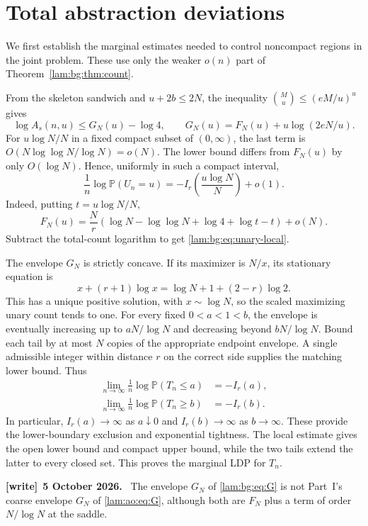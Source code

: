 \documentclass[11pt,a4paper]{article}
\numberwithin{equation}{section}
\theoremstyle{remark}
\newcommand{\Prob}{\mathbb P}
\newenvironment{writenote}[1][]{\par\smallskip\begingroup\small
 \noindent\textbf{[write]}\if\relax\detokenize{#1}\relax\else~\textbf{#1.}\fi\ }%
 {\par\endgroup\smallskip}
\begin{document}
\section{Total abstraction deviations}\label{lam:bg:sec:unary}
We first establish the marginal estimates needed to control noncompact regions in the joint problem. These use only the weaker $o(n)$ part of Theorem~\ref{lam:bg:thm:count}.

From the skeleton sandwich and $u+2b\le2N$, the inequality $\binom Mu\le(eM/u)^u$ gives
\begin{equation}\label{lam:bg:eq:G}
 \log A_s(n,u)\le G_N(u)-\log4,
 \qquad G_N(u)=F_N(u)+u\log(2eN/u).
\end{equation}
For $u\log N/N$ in a fixed compact subset of $(0,\infty)$, the last term is $O(N\log\log N/\log N)=o(N)$. The lower bound differs from $F_N(u)$ by only $O(\log N)$. Hence, uniformly in such a compact interval,
\begin{equation}\label{lam:bg:eq:unary-local}
 \frac1n\log\Prob(U_n=u)=-I_r\!\left(\frac{u\log N}{N}\right)+o(1).
\end{equation}
Indeed, putting $t=u\log N/N$,
\[
 F_N(u)=\frac Nr\left(\log N-\log\log N+\log4+\log t-t\right)+o(N).
\]
Subtract the total-count logarithm to get \eqref{lam:bg:eq:unary-local}.

The envelope $G_N$ is strictly concave. If its maximizer is $N/x$, its stationary equation is
\begin{equation}\label{lam:bg:eq:G-saddle}
 x+(r+1)\log x=\log N+1+(2-r)\log2.
\end{equation}
This has a unique positive solution, with $x\sim\log N$, so the scaled maximizing unary count tends to one. For every fixed $0<a<1<b$, the envelope is eventually increasing up to $aN/\log N$ and decreasing beyond $bN/\log N$. Bound each tail by at most $N$ copies of the appropriate endpoint envelope. A single admissible integer within distance $r$ on the correct side supplies the matching lower bound. Thus
\begin{align}
 \lim_{n\to\infty}\frac1n\log\Prob(T_n\le a)&=-I_r(a),\label{lam:bg:eq:unary-lower}\\
 \lim_{n\to\infty}\frac1n\log\Prob(T_n\ge b)&=-I_r(b).\label{lam:bg:eq:unary-upper}
\end{align}
In particular, $I_r(a)\to\infty$ as $a\downarrow0$ and $I_r(b)\to\infty$ as $b\to\infty$. These provide the lower-boundary exclusion and exponential tightness. The local estimate gives the open lower bound and compact upper bound, while the two tails extend the latter to every closed set. This proves the marginal LDP for $T_n$.
\begin{writenote}[5 October 2026]
The envelope $G_N$ of \eqref{lam:bg:eq:G} is not Part~I's coarse envelope $G_N$ of \eqref{lam:ao:eq:G}, although both are $F_N$ plus a term of order $N/\log N$ at the saddle.
\end{writenote}
\end{document}
